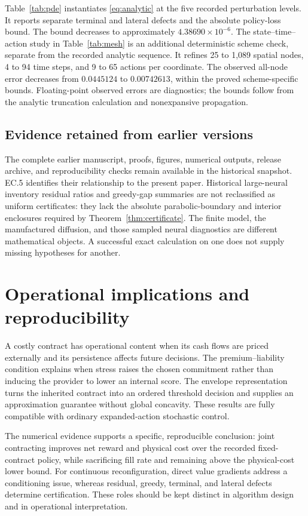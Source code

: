 Table~\ref{tab:pde} instantiates \eqref{eq:analytic} at the five recorded perturbation levels. It reports separate terminal and lateral defects and the absolute policy-loss bound. The bound decreases to approximately $4.38690\times10^{-6}$. The state--time--action study in Table~\ref{tab:mesh} is an additional deterministic scheme check, separate from the recorded analytic sequence. It refines 25 to 1,089 spatial nodes, 4 to 94 time steps, and 9 to 65 actions per coordinate. The observed all-node error decreases from $0.0445124$ to $0.00742613$, within the proved scheme-specific bounds. Floating-point observed errors are diagnostics; the bounds follow from the analytic truncation calculation and nonexpansive propagation.

\subsection{Evidence retained from earlier versions}
The complete earlier manuscript, proofs, figures, numerical outputs, release archive, and reproducibility checks remain available in the historical snapshot. EC.5 identifies their relationship to the present paper. Historical large-neural inventory residual ratios and greedy-gap summaries are not reclassified as uniform certificates: they lack the absolute parabolic-boundary and interior enclosures required by Theorem~\ref{thm:certificate}. The finite model, the manufactured diffusion, and those sampled neural diagnostics are different mathematical objects. A successful exact calculation on one does not supply missing hypotheses for another.

\section{Operational implications and reproducibility}\label{sec:conclusion}
A costly contract has operational content when its cash flows are priced externally and its persistence affects future decisions. The premium--liability condition explains when stress raises the chosen commitment rather than inducing the provider to lower an internal score. The envelope representation turns the inherited contract into an ordered threshold decision and supplies an approximation guarantee without global concavity. These results are fully compatible with ordinary expanded-action stochastic control.

The numerical evidence supports a specific, reproducible conclusion: joint contracting improves net reward and physical cost over the recorded fixed-contract policy, while sacrificing fill rate and remaining above the physical-cost lower bound. For continuous reconfiguration, direct value gradients address a conditioning issue, whereas residual, greedy, terminal, and lateral defects determine certification. These roles should be kept distinct in algorithm design and in operational interpretation.

